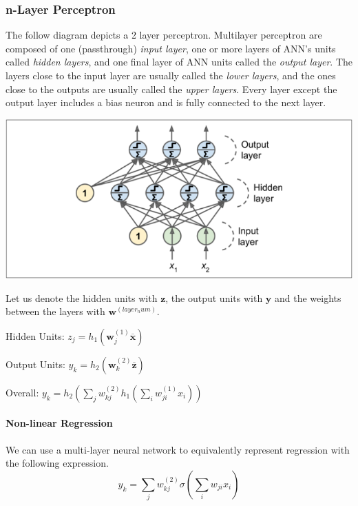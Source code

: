 \documentclass[12pt]{article}
\begin{document}
        \subsubsection{n-Layer Perceptron}
            The follow diagram depicts a 2 layer perceptron. Multilayer perceptron are composed of one (passthrough)
            \textit{input layer}, one or more layers of ANN's units called \textit{hidden layers}, and one final layer of
            ANN units called the \textit{output layer}. The layers close to the input layer are usually called the
            \textit{lower layers}, and the ones close to the outputs are usually called the \textit{upper layers}. Every
            layer except the output layer includes a bias neuron and is fully connected to the next layer.
            
            \begin{center}
                \includegraphics[scale=0.65]{MLP}
            \end{center}

            Let us denote the hidden units with $\boldsymbol{z}$, the output units with $\boldsymbol{y}$ and the weights
            between the layers with $\boldsymbol{w}^(layer_num)$.
            
            Hidden Units: $z_j = h_1(\boldsymbol{w}_j^{(1)} \overline{\boldsymbol{x}})$

            Output Units: $y_k = h_2(\boldsymbol{w}_k^{(2)} \overline{\boldsymbol{z}})$

            Overall: $y_k = h_2 (\sum_j w_{kj}^{(2)} h_1(\sum_i w_{ji}^{(1)}x_i))$

            \paragraph{Non-linear Regression}
                We can use a multi-layer neural network to equivalently represent regression with the following expression.
                $$ y_k = \sum_j w_{kj}^{(2)} \sigma(\sum_i w_{ji} x_i) $$
\end{document}
